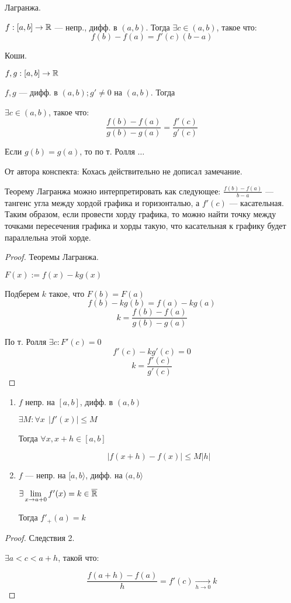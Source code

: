 

\cfoot{}


\begin{theorem}
    Лагранжа.

    $f:[a,b]\to\operatorname*{\mathbb{R}}$ --- непр., дифф. в $(a, b)$. Тогда $\exists c\in(a,b)$, такое что:
    $$f(b)-f(a)=f'(c)(b-a)$$
\end{theorem}
\begin{theorem}
    Коши.

    $f,g : [a,b]\to\operatorname*{\mathbb{R}}$

    $f,g$ --- дифф. в $(a, b); g'\not=0$ на $(a,b)$. Тогда

    $\exists c\in(a,b)$, такое что:
    $$\frac{f(b)-f(a)}{g(b)-g(a)}=\frac{f'(c)}{g'(c)}$$
\end{theorem}
\begin{remark}
    Если $g(b)=g(a)$, то по т. Ролля $\ldots$
\end{remark}
\begin{remark}
    От автора конспекта: Кохась действительно не дописал замечание.
\end{remark}
\begin{remark}
    Теорему Лагранжа можно интерпретировать как следующее: $\frac{f(b)-f(a)}{b-a}$ --- тангенс угла между хордой графика и горизонталью, а $f'(c)$ --- касательная. Таким образом, если провести хорду графика, то можно найти точку между точками пересечения графика и хорды такую, что касательная к графику будет параллельна этой хорде.
\end{remark}
\begin{proof}
    Теоремы Лагранжа.

    $F(x):=f(x)-kg(x)$

    Подберем $k$ такое, что $F(b)=F(a)$
    $$f(b)-kg(b)=f(a)-kg(a)$$
    $$k=\frac{f(b)-f(a)}{g(b)-g(a)}$$

    По т. Ролля $\exists c:F'(c)=0$
    $$f'(c)-kg'(c)=0$$
    $$k=\frac{f'(c)}{g'(c)}$$
\end{proof}
\begin{consequence}
    \begin{enumerate}
        \item $f$ непр. на $[a,b]$, дифф. в $(a,b)$

        $\exists M : \forall x \ \ |f'(x)|\leq M$
    
        Тогда $\forall x, x+h\in[a,b]$
    
        $$|f(x+h)-f(x)|\leq M|h|$$

        \item $f$ --- непр. на $[a,b\rangle$, дифф. на $(a,b\rangle$
        
        $\exists \lim\limits_{x\to a+0}f'(x)=k\in\overline{\operatorname*{\mathbb{R}}}$

        Тогда $f'_+(a)=k$
    \end{enumerate}
\end{consequence}
\begin{proof}
    Следствия 2.

    $\exists a<c<a+h$, такой что:

    $$\frac{f(a+h)-f(a)}{h}=f'(c)\xrightarrow[h\to0]{} k$$
\end{proof}

